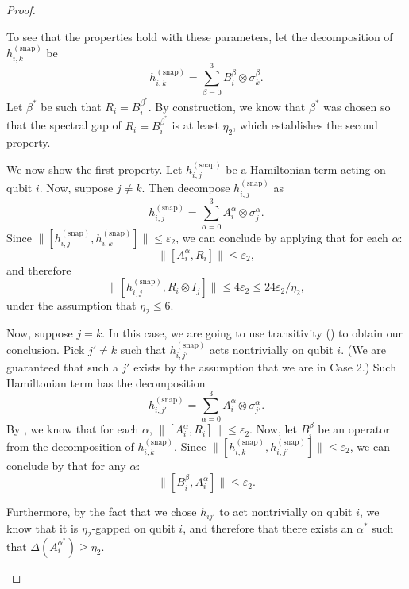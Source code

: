 \documentclass[11pt]{article}
\theoremstyle{plain}
\newcommand{\eps}{\varepsilon}
\newcommand{\snp}{{(\mathrm{snap})}}
\begin{document}
\begin{proof}
\begin{enumerate}
To see that the properties hold with these parameters, let the decomposition of $h^\snp_{i,k}$ be
\begin{equation}
    h^\snp_{i,k} = \sum_{\beta=0}^3 B_i^\beta \otimes \sigma_k^\beta.
\end{equation}
Let $\beta^*$ be such that $R_i = B_i^{\beta^*}$. By construction, we know that $\beta^*$ was chosen so that the spectral gap of  $R_i = B_i^{\beta^*}$ is at least $\eta_2$, which establishes the second property. 

We now show the first property. Let $h^\snp_{i,j}$ be a Hamiltonian term acting on qubit $i$. Now, suppose $j \neq k$. Then decompose $h^\snp_{i,j}$ as
\begin{equation}
    h^\snp_{i,j}  = \sum_{\alpha=0}^3 A_i^\alpha \otimes \sigma_j^\alpha. 
\end{equation}
Since $\|[h^\snp_{i,j},h^\snp_{i,k}]\| \leq \eps_2$, we can conclude by applying  that for each $\alpha$:
\begin{equation}
 \| [A_i^\alpha, R_i] \| \leq \eps_2, \label{eq:pivot-commutes-different-term-2}
\end{equation}
and therefore
\begin{equation}
    \| [h^\snp_{i,j}, R_i \otimes I_j ] \| \leq 4 \eps_2 \leq 24\eps_2/\eta_2,
\end{equation}
under the assumption that $\eta_2 \leq 6$.

Now, suppose $j = k$. In this case, we are going to use transitivity () to obtain our conclusion. Pick $j' \neq k$ such that $h^\snp_{i,j'}$ acts nontrivially on qubit $i$. (We are guaranteed that such a $j'$ exists by the assumption that we are in Case 2.) Such Hamiltonian term has the decomposition
\begin{equation}
    h^\snp_{i,j'} = \sum_{\alpha=0}^3 A_i^\alpha \otimes \sigma_{j'}^\alpha. 
\end{equation}
By , we know that for each $\alpha$, $\| [A_i^\alpha, R_i]\| \leq \eps_2.$ Now, let $B_i^\beta$ be an operator from the decomposition of $h^\snp_{i,k}$. Since $\| [h^\snp_{i,k}, h^\snp_{i,j'}] \| \leq \eps_2$, we can conclude by  that for any $\alpha$:
\begin{equation}
    \| [ B_i^\beta, A_i^\alpha] \| \leq \eps_2.
\end{equation}

Furthermore, by the fact that we chose $h_{ij'}$ to act nontrivially on qubit $i$, we know that it is $\eta_2$-gapped on qubit $i$, and therefore that there exists an $\alpha^*$ such that $\Delta(A_i^{\alpha^*}) \geq \eta_2$. 


\end{enumerate}
\end{proof}
\end{document}
